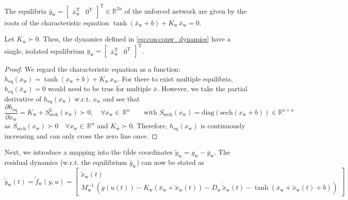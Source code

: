 The equilibria $\bar{y}_\mathrm{w} = \begin{bmatrix}
    \bar{x}_\mathrm{w}^\mathrm{T} & 0^\mathrm{T}
\end{bmatrix}^\mathrm{T} \in \mathbb{R}^{2n}$ of the unforced network are given by the roots of the characteristic equation $\tanh(\bar{x}_\mathrm{w} + b) + K_\mathrm{w} \, \bar{x}_\mathrm{w} = 0$.%
\begin{lemma}\label{lemma:con:conw_single_equilbrium}
    Let $K_\mathrm{w} \succ 0$. Then, the dynamics defined in \eqref{eq:con:conw_dynamics} have a single, isolated equilibrium $\bar{y}_\mathrm{w} = \begin{bmatrix}
        \bar{x}_\mathrm{w}^\mathrm{T} & 0^\mathrm{T}
    \end{bmatrix}^\mathrm{T}$.
\end{lemma}
\begin{proof}
    We regard the characteristic equation as a function: $h_\mathrm{eq}(x_\mathrm{w}) = \tanh(x_\mathrm{w} + b) + K_\mathrm{w} \, x_\mathrm{w}$. For there to exist multiple equilibria, $h_\mathrm{eq}(\bar{x}_\mathrm{w}) = 0$ would need to be true for multiple $\bar{x}$. However, we take the partial derivative of $h_\mathrm{eq}(x_\mathrm{w})$ w.r.t. $x_\mathrm{w}$ and see that
    \begin{equation}\label{eq:con:lemma_conw_single_equilbrium}
        \frac{\partial h_\mathrm{eq}}{\partial x_\mathrm{w}} =  K_\mathrm{w} + S_\mathrm{sech}^2(x_\mathrm{w}) \succ 0, \quad \forall x_\mathrm{w} \in \, \mathbb{R}^n
        \qquad \text{with }
        S_\mathrm{sech}(x_\mathrm{w}) = \mathrm{diag}(\mathrm{sech}(x_\mathrm{w} + b)) \in \mathbb{R}^{n \times n}
    \end{equation}
    as $S_\mathrm{sech}(x_\mathrm{w}) \succ 0 \quad \forall x_\mathrm{w} \in \, \mathbb{R}^n$ and $K_\mathrm{w} \succ 0$. Therefore, $h_\mathrm{eq}(x_\mathrm{w})$ is continuously increasing and can only cross the zero line once.
\end{proof}
Next, we introduce a mapping into the $\tilde{\text{tilde}}$ coordinates $\tilde{y}_\mathrm{w} = y_\mathrm{w} - \bar{y}_\mathrm{w}$. The residual dynamics (w.r.t. the equilibrium $\bar{y}_\mathrm{w}$) can now be stated as
\begin{equation}\label{eq:con:conw_residual_dynamics}
    \dot{\tilde{y}}_\mathrm{w}(t) = \tilde{f}_\mathrm{w}(y, u) = \begin{bmatrix}
        \dot{\tilde{x}}_\mathrm{w}(t)\\
        M_\mathrm{w}^{-1} \, \left (g(u(t)) -K_\mathrm{w} \left (\bar{x}_\mathrm{w} + \tilde{x}_\mathrm{w}(t) \right ) - D_\mathrm{w} \, \dot{\tilde{x}}_\mathrm{w}(t) - \tanh(\bar{x}_\mathrm{w} + \tilde{x}_\mathrm{w}(t) + b) \right )
    \end{bmatrix}
\end{equation}

